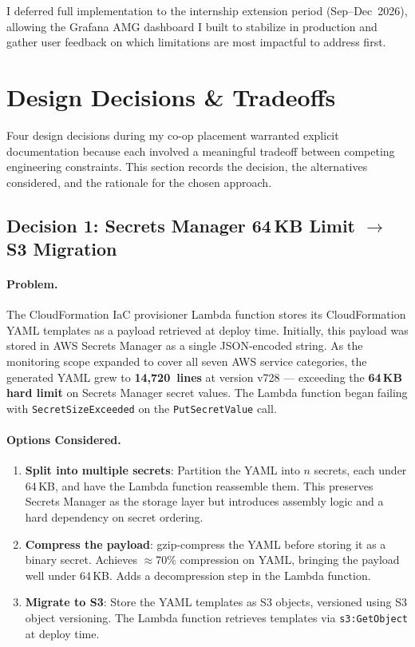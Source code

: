 I deferred full implementation to the internship extension period
(Sep--Dec~2026), allowing the Grafana AMG dashboard I built to stabilize in
production and gather user feedback on which limitations are most
impactful to address first.

\FloatBarrier

\section{Design Decisions \& Tradeoffs}
\label{sec:design_decisions}


Four design decisions during my co-op placement warranted explicit
documentation because each involved a meaningful tradeoff between
competing engineering constraints. This section records the decision,
the alternatives considered, and the rationale for the chosen approach.

\subsection{Decision 1: Secrets Manager 64\,KB Limit \texorpdfstring{$\to$}{→} S3 Migration}
\label{sec:decision_secrets_s3}

\paragraph{Problem.}
The CloudFormation IaC provisioner Lambda function stores its
CloudFormation YAML templates as a payload retrieved at deploy time.
Initially, this payload was stored in AWS Secrets Manager as a single
JSON-encoded string. As the monitoring scope expanded to cover all seven
AWS service categories, the generated YAML grew to \textbf{14,720~lines}
at version v728 --- exceeding the \textbf{64\,KB hard limit} on
Secrets Manager secret values. The Lambda function began failing with
\texttt{SecretSizeExceeded} on the \texttt{PutSecretValue} call.

\paragraph{Options Considered.}

\begin{enumerate}
    \item \textbf{Split into multiple secrets}: Partition the YAML
          into $n$ secrets, each under 64\,KB, and have the Lambda
          function reassemble them. This preserves Secrets Manager
          as the storage layer but introduces assembly logic and
          a hard dependency on secret ordering.

    \item \textbf{Compress the payload}: gzip-compress the YAML before
          storing it as a binary secret. Achieves $\approx$70\%
          compression on YAML, bringing the payload well under 64\,KB.
          Adds a decompression step in the Lambda function.

    \item \textbf{Migrate to S3}: Store the YAML templates as S3 objects,
          versioned using S3 object versioning. The Lambda function
          retrieves templates via \texttt{s3:GetObject} at deploy time.
\end{enumerate}

